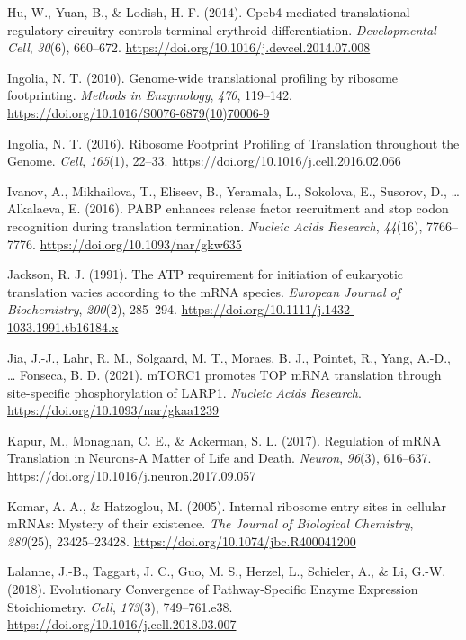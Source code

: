 \documentclass[12pt,openany]{book}
\begin{document}
\hypertarget{ref-Hu2014}{}
Hu, W., Yuan, B., \& Lodish, H. F. (2014). Cpeb4-mediated translational
regulatory circuitry controls terminal erythroid differentiation.
\emph{Developmental Cell}, \emph{30}(6), 660--672.
\url{https://doi.org/10.1016/j.devcel.2014.07.008}

\hypertarget{ref-Ingolia2010}{}
Ingolia, N. T. (2010). Genome-wide translational profiling by ribosome
footprinting. \emph{Methods in Enzymology}, \emph{470}, 119--142.
\url{https://doi.org/10.1016/S0076-6879(10)70006-9}

\hypertarget{ref-Ingolia2016}{}
Ingolia, N. T. (2016). Ribosome Footprint Profiling of Translation
throughout the Genome. \emph{Cell}, \emph{165}(1), 22--33.
\url{https://doi.org/10.1016/j.cell.2016.02.066}

\hypertarget{ref-Ivanov2016}{}
Ivanov, A., Mikhailova, T., Eliseev, B., Yeramala, L., Sokolova, E.,
Susorov, D., \ldots{} Alkalaeva, E. (2016). PABP enhances release factor
recruitment and stop codon recognition during translation termination.
\emph{Nucleic Acids Research}, \emph{44}(16), 7766--7776.
\url{https://doi.org/10.1093/nar/gkw635}

\hypertarget{ref-Jackson1991}{}
Jackson, R. J. (1991). The ATP requirement for initiation of eukaryotic
translation varies according to the mRNA species. \emph{European Journal
of Biochemistry}, \emph{200}(2), 285--294.
\url{https://doi.org/10.1111/j.1432-1033.1991.tb16184.x}

\hypertarget{ref-Jia2021}{}
Jia, J.-J., Lahr, R. M., Solgaard, M. T., Moraes, B. J., Pointet, R.,
Yang, A.-D., \ldots{} Fonseca, B. D. (2021). mTORC1 promotes TOP mRNA
translation through site-specific phosphorylation of LARP1.
\emph{Nucleic Acids Research}.
\url{https://doi.org/10.1093/nar/gkaa1239}

\hypertarget{ref-Kapur2017}{}
Kapur, M., Monaghan, C. E., \& Ackerman, S. L. (2017). Regulation of
mRNA Translation in Neurons-A Matter of Life and Death. \emph{Neuron},
\emph{96}(3), 616--637.
\url{https://doi.org/10.1016/j.neuron.2017.09.057}

\hypertarget{ref-Komar2005}{}
Komar, A. A., \& Hatzoglou, M. (2005). Internal ribosome entry sites in
cellular mRNAs: Mystery of their existence. \emph{The Journal of
Biological Chemistry}, \emph{280}(25), 23425--23428.
\url{https://doi.org/10.1074/jbc.R400041200}

\hypertarget{ref-Lalanne2018}{}
Lalanne, J.-B., Taggart, J. C., Guo, M. S., Herzel, L., Schieler, A., \&
Li, G.-W. (2018). Evolutionary Convergence of Pathway-Specific Enzyme
Expression Stoichiometry. \emph{Cell}, \emph{173}(3), 749--761.e38.
\url{https://doi.org/10.1016/j.cell.2018.03.007}
\end{document}
